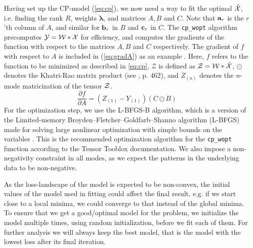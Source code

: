 Having set up the CP-model (\ref{eq:cp}), we now need a way to fit the optimal $\mathcal{\hat{X}}$, i.e. finding the rank $R$, weights $\boldsymbol{\lambda}$, and matrices $A, B$ and $C$.
Note that $\mathbf{a}_r$ is the $r$'th column of $A$, and similar for $\mathbf{b}_r$ in $B$ and $\mathbf{c}_r$ in $C$.
The \texttt{cp\_wopt} algorithm precomputes $\mathcal{Y} = \mathcal{W} * \mathcal{X}$ for efficiency, and computes the gradients of the function with respect to the matrices $A, B$ and $C$ respectively.
The gradient of $f$ with respect to $A$ is included in (\ref{eq:gradA}) as an example \cite{cp-wopt}.
Here, $f$ refers to the function to be minimized as described in \ref{eq:cp}, $\mathcal{Z}$ is defined as $\mathcal{Z} = \mathcal{W} * \mathcal{\hat{X}}$, $\odot$ denotes the Khatri-Rao matrix product (see \textcite{tensor-review}, p. 462), and $Z_{(n)}$ denotes the $n$-mode matricization of the tensor $\mathcal{Z}$.
\begin{equation}
    \frac{\partial f}{\partial A} = (Z_{(1)} - Y_{(1)})(C \odot B) 
    \label{eq:gradA}
\end{equation}
For the optimization step, we use the L-BFGS-B algorithm, which is a version of the Limited-memory Broyden–Fletcher–Goldfarb–Shanno algorithm (L-BFGS) made for solving large nonlinear optimization with simple bounds on the variables \cite{lbfgsb}.
This is the recommended optimization algorithm for the \texttt{cp\_wopt} function according to the Tensor Tooblox documentation.
We also impose a non-negativity constraint in all modes, as we expect the patterns in the underlying data to be non-negative.

As the loss-landscape of the model is expected to be non-convex, the initial values of the model used in fitting could affect the final result, e.g. if we start close to a local minima, we could converge to that instead of the global minima.
To ensure that we get a good/optimal model for the problem, we initialize the model multiple times, using random initialization, before we fit each of them.
For further analysis we will always keep the best model, that is the model with the lowest loss after its final iteration.







